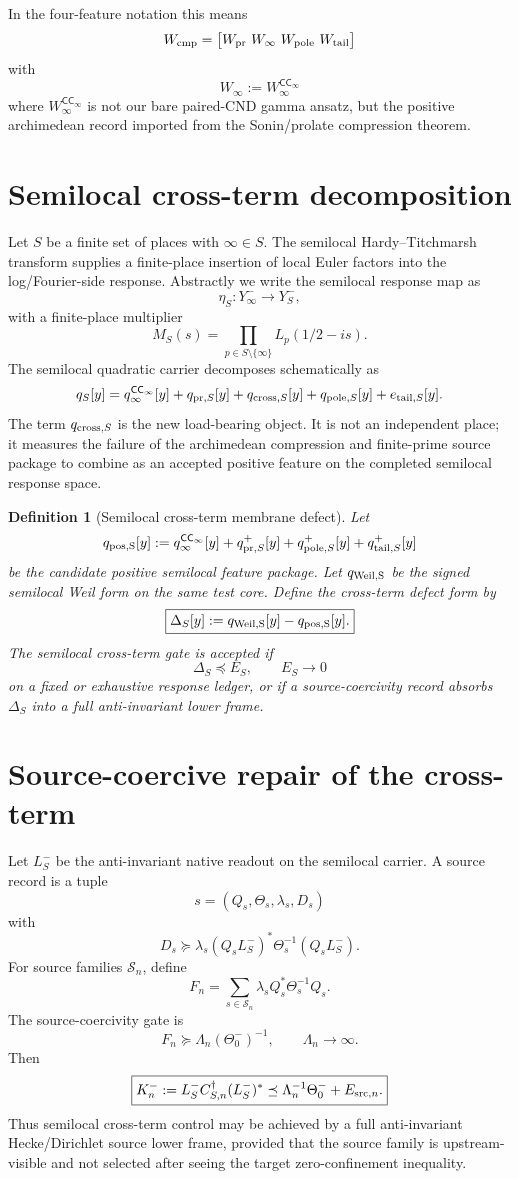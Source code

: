 \documentclass[11pt]{article}
\newtheorem{definition}{Definition}
\newcommand{\CC}{\mathsf{CC}_\infty}
\begin{document}
In the four-feature notation this means
\[
W_{\rm cmp}
=
\begin{bmatrix}
W_{\rm pr}\ W_\infty\ W_{\rm pole}\ W_{\rm tail}
\end{bmatrix}
\]
with
\[
\boxed{
W_\infty := W_\infty^{\CC}
}
\]
where \(W_\infty^{\CC}\) is not our bare paired-CND gamma ansatz, but the positive archimedean record imported from the Sonin/prolate compression theorem.

\section{Semilocal cross-term decomposition}
Let \(S\) be a finite set of places with \(\infty\in S\).  The semilocal Hardy--Titchmarsh transform supplies a finite-place insertion of local Euler factors into the log/Fourier-side response.  Abstractly we write the semilocal response map as
\[
\eta_S:Y^-_\infty\longrightarrow Y^-_S,
\]
with a finite-place multiplier
\[
M_S(s)=\prod_{p\in S\setminus\{\infty\}}L_p(1/2-is).
\]
The semilocal quadratic carrier decomposes schematically as
\[
q_S[y]
=
q_\infty^{\CC}[y]
+
q_{{\rm pr},S}[y]
+
q_{{\rm cross},S}[y]
+
q_{{\rm pole},S}[y]
+
e_{{\rm tail},S}[y].
\]
The term \(q_{{\rm cross},S}\) is the new load-bearing object.  It is not an independent place; it measures the failure of the archimedean compression and finite-prime source package to combine as an accepted positive feature on the completed semilocal response space.

\begin{definition}[Semilocal cross-term membrane defect]
Let
\[
q_{\rm pos,S}[y]
:=q_\infty^{\CC}[y]+q_{{\rm pr},S}^{+}[y]+q_{{\rm pole},S}^{+}[y]+q_{{\rm tail},S}^{+}[y]
\]
be the candidate positive semilocal feature package.  Let \(q_{\rm Weil,S}\) be the signed semilocal Weil form on the same test core.  Define the cross-term defect form by
\[
\boxed{
\Delta_S[y]
:=q_{\rm Weil,S}[y]-q_{\rm pos,S}[y].
}
\]
The semilocal cross-term gate is accepted if
\[
\boxed{
\Delta_S\preceq E_S,
\qquad E_S\to0
}
\]
on a fixed or exhaustive response ledger, or if a source-coercivity record absorbs \(\Delta_S\) into a full anti-invariant lower frame.
\end{definition}

\section{Source-coercive repair of the cross-term}
Let \(L_S^-\) be the anti-invariant native readout on the semilocal carrier.  A source record is a tuple
\[
s=(Q_s,\Theta_s,\lambda_s,D_s)
\]
with
\[
D_s\succeq
\lambda_s(Q_sL_S^-)^*\Theta_s^{-1}(Q_sL_S^-).
\]
For source families \(\mathcal S_n\), define
\[
F_n=
\sum_{s\in\mathcal S_n}\lambda_sQ_s^*\Theta_s^{-1}Q_s.
\]
The source-coercivity gate is
\[
\boxed{
F_n\succeq \Lambda_n(\Theta_0^-)^{-1},
\qquad \Lambda_n\to\infty.
}
\]
Then
\[
\boxed{
K_n^-:=L_S^- C_{S,n}^{\dagger}(L_S^-)^*
\preceq \Lambda_n^{-1}\Theta_0^-+E_{{\rm src},n}.
}
\]
Thus semilocal cross-term control may be achieved by a full anti-invariant Hecke/Dirichlet source lower frame, provided that the source family is upstream-visible and not selected after seeing the target zero-confinement inequality.
\end{document}
